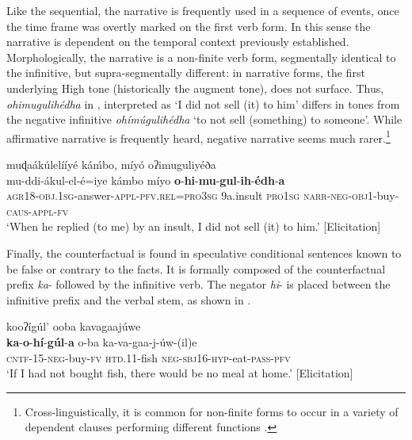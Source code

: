 \documentclass[output=paper,colorlinks=true, citecolor=brown,draftmode]{langscibook}
\begin{document}
Like the sequential, the narrative is frequently used in a sequence of events, once the time frame was overtly marked on the first verb form. In this sense the narrative is dependent on the temporal context previously established. Morphologically, the narrative is a non-finite verb form, segmentally identical to the infinitive, but supra-segmentally different: in narrative forms, the first underlying High tone (historically the augment tone), does not surface. Thus, \textit{ohimugulihédha} in , interpreted as ‘I did not sell (it) to him’ differs in tones from the negative infinitive \textit{ohímúgulihédha} ‘to not sell (something) to someone’. While affirmative narrative is frequently heard, negative narrative seems much rarer.\footnote{Cross-linguistically, it is common for non-finite forms to occur in a variety of dependent clauses performing different functions \citep{Cristofaro2003}.}

\ea\label{ex:cuw:46} muɖaákúlelííyé káḿbo, míyó oʔimuguliyéða \\ 
    \gll mu{}-ddi-ákul-el-é=iye kámbo míyo \textbf{o}{}-\textbf{hi}{}-\textbf{mu}{}-\textbf{gul}{}-\textbf{ih}{}-\textbf{édh}{}-\textbf{a}  \\
         \textsc{agr18-obj.1sg}{}-answer-\textsc{appl-pfv.rel=pro3sg} 9a.insult \textsc{pro1sg} \textsc{narr-neg-obj1}{}-buy-\textsc{caus-appl-fv} \\
    \glt ‘When he replied (to me) by an insult, I did not sell (it) to him.’ [Elicitation]
\z 

Finally, the counterfactual is found in speculative conditional sentences known to be false or contrary to the facts. It is formally composed of the counterfactual prefix \textit{ka}{}- followed by the infinitive verb. The negator \textit{hi}{}- is placed between the infinitive prefix and the verbal stem, as shown in .

\ea\label{ex:cuw:47} kooʔígúl’ ooba kavagaajúwe \\ 
    \gll  \textbf{ka}{}-\textbf{o}{}-\textbf{hí}{}-\textbf{gúl}{}-\textbf{a} o-ba ka-va-gaa-j-úw-(il)e \\
         \textsc{cntf-15-neg}{}-buy-\textsc{fv} \textsc{htd.11}{}-fish \textsc{neg-sbj16-hyp}{}-eat-\textsc{pass-pfv} \\
    \glt ‘If I had not bought fish, there would be no meal at home.’ [Elicitation]
\z 
\end{document}
